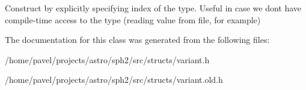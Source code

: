 Construct by explicitly specifying index of the type. Useful in case we don\textquotesingle{}t have compile-\/time access to the type (reading value from file, for example) 

The documentation for this class was generated from the following files\+:\begin{DoxyCompactItemize}
\item 
/home/pavel/projects/astro/sph2/src/structs/variant.\+h\item 
/home/pavel/projects/astro/sph2/src/structs/variant.\+old.\+h\end{DoxyCompactItemize}
